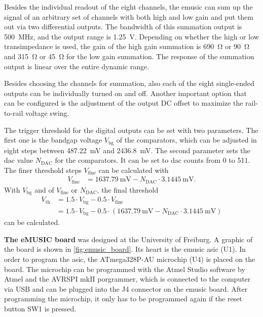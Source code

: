 Besides the individual readout of the eight channels, the \ac{emusic} can sum up the signal of an arbitrary set of channels with both high and low gain and put them out via two differential outputs.
The bandwidth of this summation output is \SI{500}{\mega\hertz}, and the output range is \SI{1.25}{\volt}.
Depending on whether the high or low transimpedance is used, the gain of the high gain summation is \SI{690}{\ohm} or \SI{90}{\ohm} and \SI{315}{\ohm} or \SI{45}{\ohm} for the low gain summation. 
The response of the summation output is linear over the entire dynamic range.

Besides choosing the channels for summation, also each of the eight single-ended outputs can be individually turned on and off.
Another important option that can be configured is the adjustment of the output DC offset to maximize the rail-to-rail voltage swing.

The trigger threshold for the digital outputs can be set with two parameters.
The first one is the bandgap voltage $V_\text{bg}$ of the comparators, which can be adjusted in eight steps between \SI{487.22}{\milli\volt} and \SI{2436.8}{\milli\volt}.
The second parameter sets the \ac{dac} value $N_\text{DAC}$ for the comparators.
It can be set to \ac{dac} counts from 0 to 511.
The finer threshold steps $V_\text{fine}$ can be calculated with
\begin{align}
	V_\text{fine}&=\SI{1637.79}{\milli\volt} - N_\text{DAC}\cdot\SI{3.1445}{\milli\volt}.
\end{align}
With $V_\text{bg}$ and  of $V_\text{fine}$ or $N_\text{DAC}$, the final threshold
\begin{align}
	V_\text{th}&= 1.5\cdot V_\text{bg} - 0.5\cdot V_\text{fine}\\
		   &= 1.5\cdot V_\text{bg} - 0.5\cdot (\SI{1637.79}{\milli\volt} - N_\text{DAC}\cdot\SI{3.1445}{\milli\volt})
\end{align}
can be calculated.

\textbf{The eMUSIC board} was designed at the University of Freiburg.
A graphic of the board is shown in \autoref{fig:emusic_board}.
Its heart is the \ac{emusic} \ac{asic} (U1).
In order to program the \ac{asic}, the ATmega328P-AU microchip (U4) is placed on the board.
The microchip can be programmed with the Atmel Studio software by Atmel and the AVRSPI mkII porgrammer, which is connected to the computer via USB and can be plugged into the J4 connector on the \ac{emusic} board.
After programming the microchip, it only has to be programmed again if the reset button SW1 is pressed.


